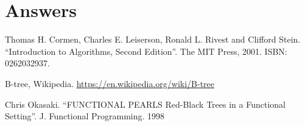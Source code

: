 \documentclass[b5paper]{article}
\begin{document}
\ifx\wholebook\relax \else
\section{Answers}
\shipoutAnswer

\begin{thebibliography}{99}

Thomas H. Cormen, Charles E. Leiserson, Ronald L. Rivest and Clifford Stein. ``Introduction to Algorithms, Second Edition''. The MIT Press, 2001. ISBN: 0262032937.

B-tree, Wikipedia. \url{https://en.wikipedia.org/wiki/B-tree}

Chris Okasaki. ``FUNCTIONAL PEARLS Red-Black Trees in a Functional Setting''. J. Functional Programming. 1998

\end{thebibliography}

\expandafter\enddocument
\fi
\end{document}
